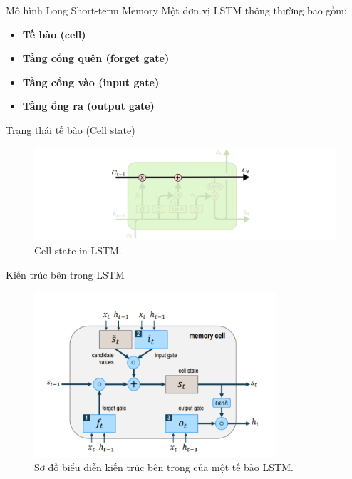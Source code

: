 \documentclass[notheorems,hyperref={bookmarks=true}]{beamer}
\theoremstyle{plain}
\numberwithin{equation}{section}
\begin{document}
\begin{footnotesize}
    \begin{frame}{Mô hình Long Short-term Memory}
    Một đơn vị LSTM thông thường bao gồm:
    \begin{itemize}
    \item \textbf{Tế bào (cell)}
    \item \textbf{Tầng cổng quên (forget gate)} 
    \item \textbf{Tầng cổng vào (input gate)} 
    \item \textbf{Tầng ổng ra (output gate)}
\end{itemize} 
    \end{frame}

    \begin{frame}{Trạng thái tế bào (Cell state)}
        \begin{figure}[H]
        \centering
        \includegraphics[width=1.2\textwidth]{figures/LSTM3-C-line.png}
        \caption{Cell state in LSTM.}
        \label{fig:cell_state}
        \end{figure}
        \par
    \end{frame}
    
    \begin{frame}{Kiến trúc bên trong LSTM}
        \begin{figure}[H]
        \centering
        \includegraphics[width=0.8\textwidth]{figures/sodo.png}
        \caption{Sơ đồ biểu diễn kiến trúc bên trong của một tế bào LSTM.}
        \label{fig:cell_state}
        \end{figure}
        \par
    \end{frame}
    

\end{footnotesize}
\end{document}
